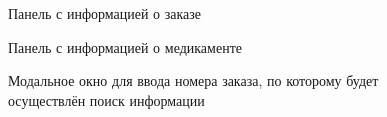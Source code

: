 \documentclass[a4paper]{article}
\begin{document}
				\begin{figure}[H]
					\centering
					\caption{Панель с информацией о заказе}
				\end{figure}

				\begin{figure}[H]
					\centering
					\caption{Панель с информацией о медикаменте}
				\end{figure}
				
				\begin{figure}[H]
					\centering
					\caption{Модальное окно для ввода номера заказа, по которому будет осуществлён поиск информации}
				\end{figure}
				
\end{document}
